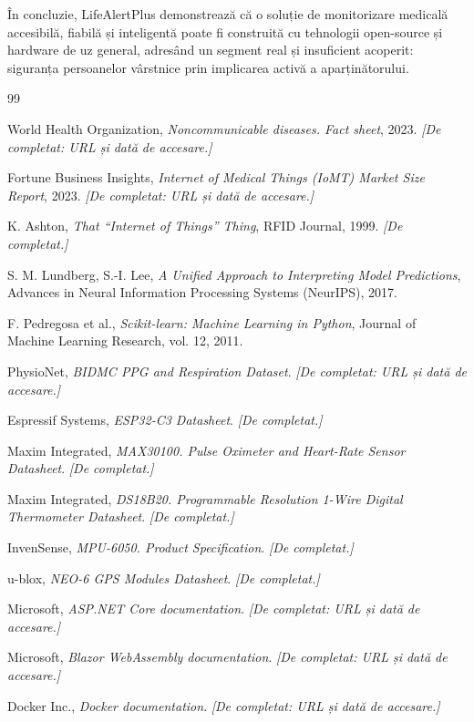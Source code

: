 \documentclass[12pt,a4paper]{article}
\begin{document}
În concluzie, LifeAlertPlus demonstrează că o soluție de monitorizare medicală accesibilă, fiabilă și inteligentă poate fi construită cu tehnologii open-source și hardware de uz general, adresând un segment real și insuficient acoperit: siguranța persoanelor vârstnice prin implicarea activă a aparținătorului.

\newpage
{}
{}
\begin{thebibliography}{99}

 World Health Organization, \textit{Noncommunicable diseases. Fact sheet}, 2023. \textit{[De completat: URL și dată de accesare.]}

 Fortune Business Insights, \textit{Internet of Medical Things (IoMT) Market Size Report}, 2023. \textit{[De completat: URL și dată de accesare.]}

 K. Ashton, \textit{That ``Internet of Things'' Thing}, RFID Journal, 1999. \textit{[De completat.]}

 S. M. Lundberg, S.-I. Lee, \textit{A Unified Approach to Interpreting Model Predictions}, Advances in Neural Information Processing Systems (NeurIPS), 2017.

 F. Pedregosa et al., \textit{Scikit-learn: Machine Learning in Python}, Journal of Machine Learning Research, vol. 12, 2011.

 PhysioNet, \textit{BIDMC PPG and Respiration Dataset}. \textit{[De completat: URL și dată de accesare.]}

 Espressif Systems, \textit{ESP32-C3 Datasheet}. \textit{[De completat.]}

 Maxim Integrated, \textit{MAX30100. Pulse Oximeter and Heart-Rate Sensor Datasheet}. \textit{[De completat.]}

 Maxim Integrated, \textit{DS18B20. Programmable Resolution 1-Wire Digital Thermometer Datasheet}. \textit{[De completat.]}

 InvenSense, \textit{MPU-6050. Product Specification}. \textit{[De completat.]}

 u-blox, \textit{NEO-6 GPS Modules Datasheet}. \textit{[De completat.]}

 Microsoft, \textit{ASP.NET Core documentation}. \textit{[De completat: URL și dată de accesare.]}

 Microsoft, \textit{Blazor WebAssembly documentation}. \textit{[De completat: URL și dată de accesare.]}

 Docker Inc., \textit{Docker documentation}. \textit{[De completat: URL și dată de accesare.]}

\end{thebibliography}
\end{document}
